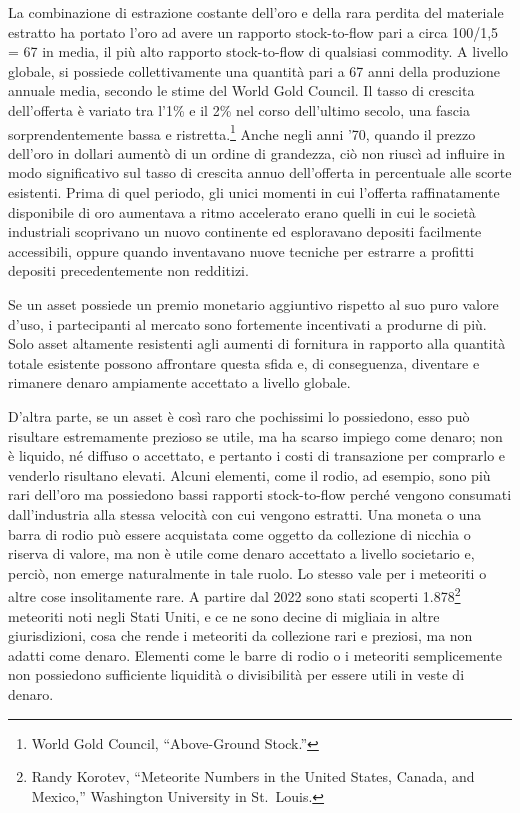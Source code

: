 \documentclass[
  a5paper,
  smalldemyvopaper,10pt,twoside,onecolumn,openright,extrafontsizes,hidelinks]{memoir}
\begin{document}
La combinazione di estrazione costante dell'oro e della rara perdita del
materiale estratto ha portato l'oro ad avere un rapporto stock-to-flow
pari a circa 100/1,5 = 67 in media, il più alto rapporto stock-to-flow
di qualsiasi commodity. A livello globale, si possiede collettivamente
una quantità pari a 67 anni della produzione annuale media, secondo le
stime del World Gold Council. Il tasso di crescita dell'offerta è
variato tra l'1\% e il 2\% nel corso dell'ultimo secolo, una fascia
sorprendentemente bassa e ristretta.\footnote{World Gold Council,
  ``Above-Ground Stock.''} Anche negli anni '70, quando il prezzo
dell'oro in dollari aumentò di un ordine di grandezza, ciò non riuscì ad
influire in modo significativo sul tasso di crescita annuo dell'offerta
in percentuale alle scorte esistenti. Prima di quel periodo, gli unici
momenti in cui l'offerta raffinatamente disponibile di oro aumentava a
ritmo accelerato erano quelli in cui le società industriali scoprivano
un nuovo continente ed esploravano depositi facilmente accessibili,
oppure quando inventavano nuove tecniche per estrarre a profitti
depositi precedentemente non redditizi.

Se un asset possiede un premio monetario aggiuntivo rispetto al suo puro
valore d'uso, i partecipanti al mercato sono fortemente incentivati a
produrne di più. Solo asset altamente resistenti agli aumenti di
fornitura in rapporto alla quantità totale esistente possono affrontare
questa sfida e, di conseguenza, diventare e rimanere denaro ampiamente
accettato a livello globale.

D'altra parte, se un asset è così raro che pochissimi lo possiedono,
esso può risultare estremamente prezioso se utile, ma ha scarso impiego
come denaro; non è liquido, né diffuso o accettato, e pertanto i costi
di transazione per comprarlo e venderlo risultano elevati. Alcuni
elementi, come il rodio, ad esempio, sono più rari dell'oro ma
possiedono bassi rapporti stock-to-flow perché vengono consumati
dall'industria alla stessa velocità con cui vengono estratti. Una moneta
o una barra di rodio può essere acquistata come oggetto da collezione di
nicchia o riserva di valore, ma non è utile come denaro accettato a
livello societario e, perciò, non emerge naturalmente in tale ruolo. Lo
stesso vale per i meteoriti o altre cose insolitamente rare. A partire
dal 2022 sono stati scoperti 1.878\footnote{Randy Korotev, ``Meteorite
  Numbers in the United States, Canada, and Mexico,'' Washington
  University in St.~Louis.} meteoriti noti negli Stati Uniti, e ce ne
sono decine di migliaia in altre giurisdizioni, cosa che rende i
meteoriti da collezione rari e preziosi, ma non adatti come denaro.
Elementi come le barre di rodio o i meteoriti semplicemente non
possiedono sufficiente liquidità o divisibilità per essere utili in
veste di denaro.
\end{document}
